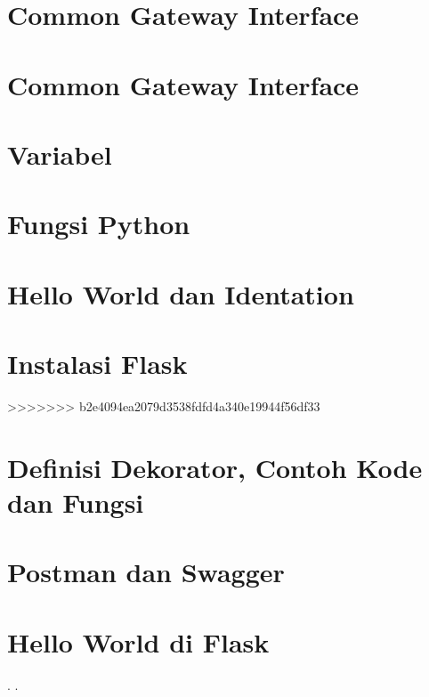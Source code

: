 \documentclass{wileySix}
\begin{document}
\chapter[Pemanggilan Modul]
{Common Gateway Interface}


\chapter[Instalasi PIP]
{Common Gateway Interface}


\chapter[Variabel]
{Variabel}




\chapter[Fungsi Python]
{Fungsi Python}


\chapter[Hello World Python dan Identation]
{Hello World dan Identation}





\chapter[Instalasi Flask]
{Instalasi Flask}

>>>>>>> b2e4094ea2079d3538fdfd4a340e19944f56df33

\chapter[Definisi Dekorator, Contoh Kode dan Fungsi]
{Definisi Dekorator, Contoh Kode dan Fungsi}


\chapter[Postman dan Swagger]
{Postman dan Swagger}


\chapter[Hello World di Flask]
{Hello World di Flask}






.
.

\printindex
\end{document}
